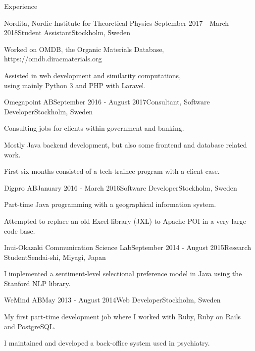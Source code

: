 \documentclass{resume} %
\begin{document}
\begin{rSection}{Experience}

\begin{rSubsection}{Nordita, Nordic Institute for Theoretical Physics} {September 2017 - March 2018}{Student Assistant}{Stockholm, Sweden}
\item Worked on OMDB, the Organic Materials Database, https://omdb.diracmaterials.org
\item Assisted in web development and similarity computations,\\using mainly Python 3 and PHP with Laravel.
\end{rSubsection}

\begin{rSubsection}{Omegapoint AB}{September 2016 - August 2017}{Consultant, Software Developer}{Stockholm, Sweden}
\item Consulting jobs for clients within government and banking. 
\item Mostly Java backend development, but also some frontend and database related work.
\item First six months consisted of a tech-trainee program with a client case.
\end{rSubsection}


\begin{rSubsection}{Digpro AB}{January 2016 - March 2016}{Software Developer}{Stockholm, Sweden}
\item Part-time Java programming with a geographical information system.
\item Attempted to replace an old Excel-library (JXL) to Apache POI in a very large code base.
\end{rSubsection}


\begin{rSubsection}{Inui-Okazaki Communication Science Lab}{September 2014 - August 2015}{Research Student}{Sendai-shi, Miyagi, Japan}
\item I implemented a sentiment-level selectional preference model in Java using the Stanford NLP library.
\end{rSubsection}


\begin{rSubsection}{WeMind AB}{May 2013 - August 2014}{Web Developer}{Stockholm, Sweden}
\item My first part-time development job where I worked with Ruby, Ruby on Rails and PostgreSQL.
\item I maintained and developed a back-office system used in psychiatry.
\end{rSubsection}

\end{rSection}
\end{document}
